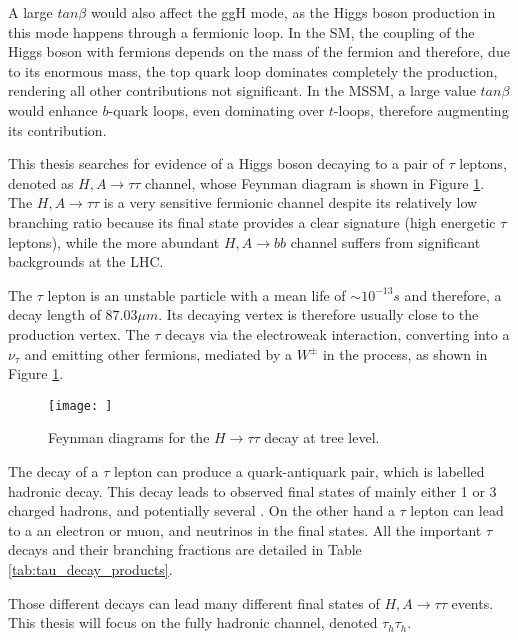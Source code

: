 A large $tan \beta$ would also affect the ggH mode, as the Higgs boson production in this mode happens through a fermionic loop. In the SM, the coupling of the Higgs boson with fermions depends on the mass of the fermion and therefore, due to its enormous mass, the top quark loop dominates completely the production, rendering all other contributions not significant. In the MSSM, a large value $tan \beta$ would enhance $b$-quark loops, even dominating over $t$-loops, therefore augmenting its contribution.\newline


This thesis searches for evidence of a Higgs boson decaying to a pair of $\tau$ leptons, denoted as $H, A \rightarrow \tau\tau$ channel, whose Feynman diagram is shown in Figure \ref{fig:htt}. The $H,A \rightarrow \tau\tau$ is a very sensitive fermionic channel despite its relatively low branching ratio because its final state provides a clear signature (high energetic $\tau$ leptons), while the more abundant $H,A \rightarrow bb$ channel suffers from significant backgrounds at the LHC.

The $\tau$ lepton is an unstable particle with a mean life of $\sim 10^{-13} s$ \cite{pdg2016} and therefore, a decay length of $87.03 \mu m$. Its decaying vertex is therefore usually close to the production vertex. The $\tau$ decays via the electroweak interaction, converting into a $\nu_{\tau}$ and emitting other fermions, mediated by a $W^{\pm}$ in the process, as shown in Figure \ref{fig:htt}.

\begin{figure}
    \centering
    \texttt{[image: ]}
    \caption{Feynman diagrams for the $H \rightarrow \tau\tau$ decay at tree level.}
    \label{fig:htt}
\end{figure}

The decay of a $\tau$ lepton can produce a quark-antiquark pair, which is labelled hadronic decay. This decay leads to observed final states of mainly either 1 or 3 charged hadrons, and potentially several \pizero. On the other hand a $\tau$ lepton can lead to a an electron or muon, and neutrinos in the final states. All the important $\tau$ decays and their branching fractions are detailed in Table \ref{tab:tau_decay_products}. 

Those different decays can lead many different final states of $H,A \rightarrow \tau\tau$ events. This thesis will focus on the fully hadronic channel, denoted $\tau_h \tau_h$.


